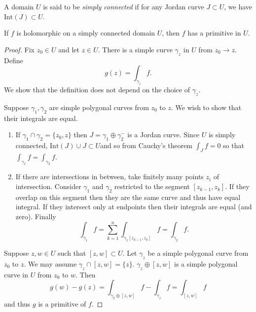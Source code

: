 \begin{defn}
A domain $U$ is said to be \emph{simply connected} if
for any Jordan curve $J \subset U$, we have
$\mathrm{Int}(J) \subset U$.
\end{defn}

\begin{theorem}
If $f$ is holomorphic on a simply connected domain $U$, then $f$
has a primitive in $U$.
\end{theorem}
\begin{proof}
Fix $z_0 \in U$ and let $z \in U$. There is a simple curve
$\gamma_z$ in $U$ from $z_0 \to z$. Define
$$
g(z) = \int_{\gamma_z} f.
$$
We show that the definition does not depend on the choice of $\gamma_z$.

Suppose $\gamma_1, \gamma_2$ are simple polygonal curves from $z_0$ to $z$.
We wish to show that their integrals are equal.
\begin{enumerate}
  \item{
    If $\gamma_1 \cap \gamma_2 = \{z_0, z\}$ then
    $J = \gamma_1 \oplus \gamma_2^{-}$ is a Jordan curve. Since $U$ is
    simply connected, $\mathrm{Int}(J) \cup J \subset U$and so
    from Cauchy's theorem $\int_J f = 0$ so that
    $\int_{\gamma_1} f = \int_{\gamma_2} f$.
  }
  \item{
    If there are intersections in between, take finitely many points
    $z_i$ of intersection. Consider
    $\gamma_1$ and $\gamma_2$ restricted to the segment $[z_{k-1}, z_k]$.
    If they overlap on this segment then they are the same curve and thus
    have equal integral. If they intersect only at endpoints then
    their integrals are equal (and zero).
    Finally
    $$
    \int_{\gamma_1} f = \sum_{k=1}^n \int_{\gamma_1[z_{k-1}, z_k]} f = \int_{\gamma_2} f.
    $$
  }
\end{enumerate}

Suppose $z, w \in U$ such that $[z, w] \subset U$. Let $\gamma_z$ be a
simple polygonal curve from $z_0$ to $z$. We may assume
$\gamma_z \cap [z, w] = \{ z \}$. $\gamma_z \oplus [z, w]$ is a simple
polygonal curve in $U$ from $z_0$ to $w$. Then
$$
g(w) - g(z) = \int_{\gamma_2 \oplus [z, w]} f - \int_{\gamma_z} f = \int_{[z, w]} f
$$
and thus $g$ is a primitive of $f$.
\end{proof}

